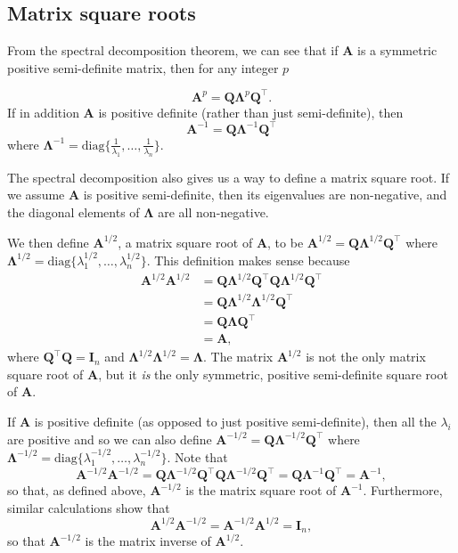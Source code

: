 \documentclass[
]{book}
\theoremstyle{definition}
\theoremstyle{definition}
\theoremstyle{definition}
\theoremstyle{definition}
\theoremstyle{remark}
\begin{document}
\subsection{Matrix square roots}\label{matrixroots}

From the spectral decomposition theorem, we can see that if \(\mathbf A\) is a symmetric positive semi-definite matrix, then for any integer \(p\)

\[\mathbf A^p = \mathbf Q\boldsymbol \Lambda^p \mathbf Q^\top.\]
If in addition \(\mathbf A\) is positive definite (rather than just semi-definite), then
\[\mathbf A^{-1} = \mathbf Q\boldsymbol \Lambda^{-1} \mathbf Q^\top\]
where \(\boldsymbol \Lambda^{-1} = \text{diag}\{ \frac{1}{\lambda _1}, \dots , \frac{1}{\lambda _n} \}\).

The spectral decomposition also gives us a way to define a matrix square root. If we assume \(\mathbf A\) is positive semi-definite, then its eigenvalues are non-negative, and the diagonal elements of \(\boldsymbol \Lambda\) are all non-negative.

We then define \({\mathbf A}^{1/2}\), a matrix square root of \(\mathbf A\), to be \({\mathbf A}^{1/2}=\mathbf Q\boldsymbol \Lambda^{1/2} \mathbf Q^\top\) where \(\boldsymbol \Lambda^{1/2}=\text{diag}\{\lambda_1^{1/2}, \ldots , \lambda_n^{1/2}\}\). This definition makes sense because
\begin{align*}
\mathbf A^{1/2}\mathbf A^{1/2}&=\mathbf Q\boldsymbol \Lambda^{1/2}\mathbf Q^\top \mathbf Q\boldsymbol \Lambda^{1/2} \mathbf Q^\top\\
&=\mathbf Q\boldsymbol \Lambda^{1/2}\boldsymbol \Lambda^{1/2}\mathbf Q^\top\\
&=\mathbf Q\boldsymbol \Lambda\mathbf Q^\top\\
&=\mathbf A,
\end{align*}
where \(\mathbf Q^\top \mathbf Q=\mathbf I_n\) and \(\boldsymbol \Lambda^{1/2}\boldsymbol \Lambda^{1/2}=\boldsymbol \Lambda\). The matrix \(\mathbf A^{1/2}\) is not the only matrix square root of \(\mathbf A\), but it \emph{is} the only symmetric, positive semi-definite square root of \(\mathbf A\).

If \(\mathbf A\) is positive definite (as opposed to just positive semi-definite), then all the \(\lambda_i\) are positive and so we can also define \(\mathbf A^{-1/2}=\mathbf Q\boldsymbol \Lambda^{-1/2}\mathbf Q^\top\) where \(\boldsymbol \Lambda^{-1/2}=\text{diag}\{\lambda_1^{-1/2},\ldots , \lambda_n^{-1/2}\}\). Note that
\[
\mathbf A^{-1/2}\mathbf A^{-1/2}=\mathbf Q\boldsymbol \Lambda^{-1/2}\mathbf Q^\top \mathbf Q\boldsymbol \Lambda^{-1/2}\mathbf Q^\top =\mathbf Q\boldsymbol \Lambda^{-1}\mathbf Q^\top=\mathbf A^{-1},
\]
so that, as defined above, \(\mathbf A^{-1/2}\) is the matrix square root of \(\mathbf A^{-1}\). Furthermore, similar calculations show that
\[
\mathbf A^{1/2}\mathbf A^{-1/2}=\mathbf A^{-1/2}\mathbf A^{1/2}=\mathbf I_n,
\]
so that \(\mathbf A^{-1/2}\) is the matrix inverse of \(\mathbf A^{1/2}\).
\end{document}

